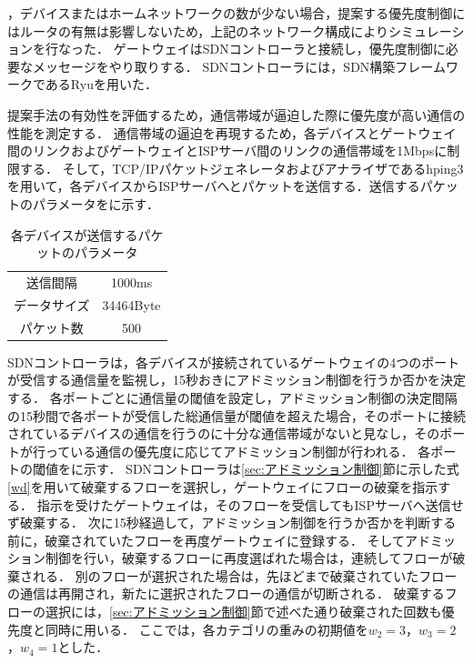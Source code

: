 \documentclass[a4paper,11pt,uplatex]{ujreport}
\begin{document}
  ，デバイスまたはホームネットワークの数が少ない場合，提案する優先度制御にはルータの有無は影響しないため，上記のネットワーク構成によりシミュレーションを行なった．
  ゲートウェイはSDNコントローラと接続し，優先度制御に必要なメッセージをやり取りする．
  SDNコントローラには，SDN構築フレームワークであるRyuを用いた．\par

  提案手法の有効性を評価するため，通信帯域が逼迫した際に優先度が高い通信の性能を測定する．
  通信帯域の逼迫を再現するため，各デバイスとゲートウェイ間のリンクおよびゲートウェイとISPサーバ間のリンクの通信帯域を1Mbpsに制限する．
  そして，TCP/IPパケットジェネレータおよびアナライザであるhping3を用いて，各デバイスからISPサーバへとパケットを送信する．送信するパケットのパラメータをに示す．

  \begin{table}[!tb]
    \caption{各デバイスが送信するパケットのパラメータ}
    \label{tab:packetParameter}
    \centering
    \begin{tabular}{cc}
      \hline
      送信間隔 & 1000ms\\
      データサイズ & 34464Byte\\
      パケット数 & 500\\
      \hline
    \end{tabular}
  \end{table}

  SDNコントローラは，各デバイスが接続されているゲートウェイの4つのポートが受信する通信量を監視し，15秒おきにアドミッション制御を行うか否かを決定する．
  各ポートごとに通信量の閾値を設定し，アドミッション制御の決定間隔の15秒間で各ポートが受信した総通信量が閾値を超えた場合，そのポートに接続されているデバイスの通信を行うのに十分な通信帯域がないと見なし，そのポートが行っている通信の優先度に応じてアドミッション制御が行われる．
  各ポートの閾値をに示す．
  SDNコントローラは\ref{sec:アドミッション制御}節に示した式\ref{wd}を用いて破棄するフローを選択し，ゲートウェイにフローの破棄を指示する．
  指示を受けたゲートウェイは，そのフローを受信してもISPサーバへ送信せず破棄する．
  次に15秒経過して，アドミッション制御を行うか否かを判断する前に，破棄されていたフローを再度ゲートウェイに登録する．
  そしてアドミッション制御を行い，破棄するフローに再度選ばれた場合は，連続してフローが破棄される．
  別のフローが選択された場合は，先ほどまで破棄されていたフローの通信は再開され，新たに選択されたフローの通信が切断される．
  破棄するフローの選択には，\ref{sec:アドミッション制御}節で述べた通り破棄された回数も優先度と同時に用いる．
  ここでは，各カテゴリの重みの初期値を$w_2=3$，$w_3=2$，$w_4=1$とした．\par
\end{document}
